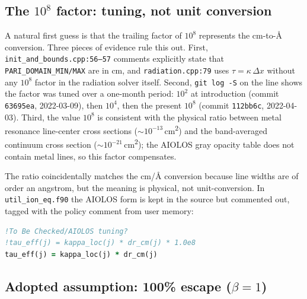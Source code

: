 \documentclass[english,a4paper]{my_memo}
\begin{document}
\subsection{The $10^{8}$ factor: tuning, not unit conversion}

A natural first guess is that the trailing factor of \(10^{8}\)
represents the cm-to-\AA{} conversion.  Three pieces of evidence rule
this out.  First, \texttt{init\_and\_bounds.cpp:56--57} comments
explicitly state that \texttt{PARI\_DOMAIN\_MIN/MAX} are in cm, and
\texttt{radiation.cpp:79} uses \(\tau = \kappa\,\Delta x\) without
any \(10^{8}\) factor in the radiation solver itself.  Second,
\texttt{git log -S} on the line shows the factor was tuned over a
one-month period: \(10^{2}\) at introduction (commit \texttt{63695ea},
2022-03-09), then \(10^{4}\), then the present \(10^{8}\) (commit
\texttt{112bb6c}, 2022-04-03).  Third, the value \(10^{8}\) is
consistent with the physical ratio between metal resonance line-center
cross sections (\(\sim 10^{-13}\)\,cm\textsuperscript{2}) and the
band-averaged continuum cross section
(\(\sim 10^{-21}\)\,cm\textsuperscript{2}); the AIOLOS gray opacity
table does not contain metal lines, so this factor compensates.

The ratio coincidentally matches the cm/\AA{} conversion because line
widths are of order an angstrom, but the meaning is physical, not
unit-conversion.  In \texttt{util\_ion\_eq.f90} the AIOLOS form is kept
in the source but commented out, tagged with the policy comment from
user memory:
\begin{lstlisting}[language=Fortran]
!To Be Checked/AIOLOS tuning?
!tau_eff(j) = kappa_loc(j) * dr_cm(j) * 1.0e8
tau_eff(j) = kappa_loc(j) * dr_cm(j)
\end{lstlisting}

\subsection{Adopted assumption: 100\% escape ($\beta = 1$)}
\label{sec:beta-one}
\end{document}
